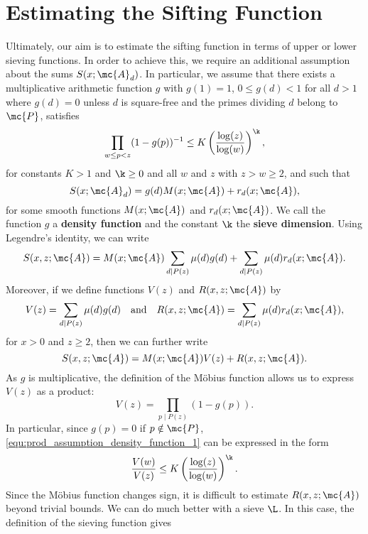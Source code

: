  \section{Estimating the Sifting Function}
    Ultimately, our aim is to estimate the sifting function in terms of upper or lower sieving functions. In order to achieve this, we require an additional assumption about the sums $S(x;\mc{A}_{d})$. In particular, we assume that there exists a multiplicative arithmetic function $g$ with $g(1) = 1$, $0 \le g(d) < 1$ for all $d > 1$ where $g(d) = 0$ unless $d$ is square-free and the primes dividing $d$ belong to $\mc{P}$, satisfies
    \begin{equation}\label{equ:prod_assumption_density_function_1}
      \prod_{w \le p < z}(1-g(p))^{-1} \le K\left(\frac{\log(z)}{\log(w)}\right)^{\k},
    \end{equation}
    for constants $K > 1$ and $\k \ge 0$ and all $w$ and $z$ with $z > w \ge 2$, and such that  
    \begin{equation}\label{equ:d_multiple_sifting_function_estimate}
      S(x;\mc{A}_{d}) = g(d)M(x;\mc{A})+r_{d}(x;\mc{A}),
    \end{equation}
    for some smooth functions $M(x;\mc{A})$ and $r_{d}(x;\mc{A})$. We call the function $g$ a \textbf{density function} and the constant $\k$ the \textbf{sieve dimension}. Using Legendre's identity, we can write
    \[
      S(x,z;\mc{A}) = M(x;\mc{A})\sum_{d \mid P(z)}\mu(d)g(d)+\sum_{d \mid P(z)}\mu(d)r_{d}(x;\mc{A}).
    \]
    Moreover, if we define functions $V(z)$ and $R(x,z;\mc{A})$ by
    \[
      V(z) = \sum_{d \mid P(z)}\mu(d)g(d) \quad \text{and} \quad R(x,z;\mc{A}) = \sum_{d \mid P(z)}\mu(d)r_{d}(x;\mc{A}),
    \]
    for $x > 0$ and $z \ge 2$, then we can further write
    \[
      S(x,z;\mc{A}) = M(x;\mc{A})V(z)+R(x,z;\mc{A}).
    \]
    As $g$ is multiplicative, the definition of the M\"obius function allows us to express $V(z)$ as a product:
    \begin{equation}\label{equ:V_product_formula}
      V(z) = \prod_{p \mid P(z)}(1-g(p)).
    \end{equation}
    In particular, since $g(p) = 0$ if $p \notin \mc{P}$, \cref{equ:prod_assumption_density_function_1} can be expressed in the form
    \begin{equation}\label{equ:prod_assumption_density_function_2}
      \frac{V(w)}{V(z)} \le K\left(\frac{\log(z)}{\log(w)}\right)^{\k}.
    \end{equation}
    Since the M\"obius function changes sign, it is difficult to estimate $R(x,z;\mc{A})$ beyond trivial bounds. We can do much better with a sieve $\L$. In this case, the definition of the sieving function gives
